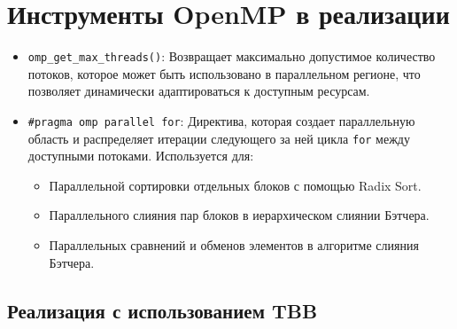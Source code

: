 \documentclass[12pt,a4paper]{extarticle}
\begin{document}
\section*{Инструменты OpenMP в реализации}
\begin{itemize}
    \item \texttt{omp\_get\_max\_threads()}:
        Возвращает максимально допустимое количество потоков, которое может быть использовано в параллельном регионе, что позволяет динамически адаптироваться к доступным ресурсам.
        
    \item \texttt{\#pragma omp parallel for}:
        Директива, которая создает параллельную область и распределяет итерации следующего за ней цикла \texttt{for} между доступными потоками. Используется для:
        \begin{itemize}
            \item Параллельной сортировки отдельных блоков с помощью Radix Sort.
            \item Параллельного слияния пар блоков в иерархическом слиянии Бэтчера.
            \item Параллельных сравнений и обменов элементов в алгоритме слияния Бэтчера.
        \end{itemize}
\end{itemize}

	\subsection{Реализация с использованием TBB}
\end{document}
